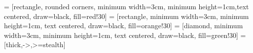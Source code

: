\usepackage{tikz}
\usepackage{pgfplots}
\usepackage{pgf-pie}
\pgfplotsset{compat=1.18}
\usetikzlibrary{shapes.geometric, arrows}
 = [rectangle, rounded corners, minimum width=3cm, minimum height=1cm,text centered, draw=black, fill=red!30]
 = [rectangle, minimum width=3cm, minimum height=1cm, text centered, draw=black, fill=orange!30]
 = [diamond, minimum width=3cm, minimum height=1cm, text centered, draw=black, fill=green!30]
 = [thick,->,>=stealth]

\usepackage{ifthen}

\newcommand{\maxwidth}{\textwidth} %

